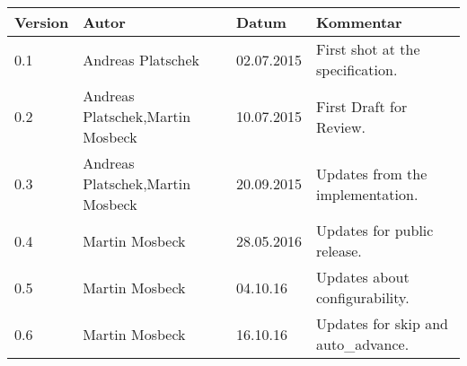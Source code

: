 
\begin{table}[h]
\begin{tabular*}{14.7cm}{|p{}|p{}|p{2cm}|p{}|}
\hline 
Version & Autor & Datum & Kommentar \\[2pt]
\hline
\hline

0.1 & Andreas Platschek & 02.07.2015 & First shot at the specification. \\[2pt]
\hline 
0.2 & Andreas Platschek,\newline Martin Mosbeck & 10.07.2015 & First Draft for Review. \\[2pt]
\hline 
0.3 & Andreas Platschek,\newline Martin Mosbeck & 20.09.2015 & Updates from the implementation. \\[2pt]
\hline 
0.4 & Martin Mosbeck & 28.05.2016 & Updates for public release. \\[2pt]
\hline 
0.5 & Martin Mosbeck & 04.10.16 & Updates about configurability. \\[2pt]
\hline
0.6 & Martin Mosbeck & 16.10.16 & Updates for skip and auto\_advance. \\[2pt]
\hline
\end{tabular*}
\end{table}

